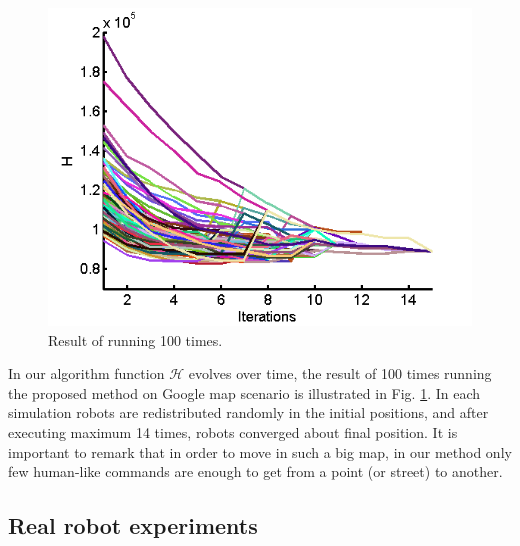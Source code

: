 \documentclass[twocolumn]{svjour3}       %
\begin{document}
\begin{figure}
\centering
\includegraphics[width=0.8 \columnwidth]{Figures/googlemapH100Times.png}
\caption{Result of running 100 times.}
\label{fig:100sim}
\end{figure}

In our algorithm function $\mathcal{H}$ evolves over time, the result of 100 times running the proposed method on Google map scenario is illustrated in Fig. \ref{fig:100sim}. In each simulation robots are redistributed randomly in the initial positions, and after executing maximum 14 times, robots converged about final position. It is important to remark that in order to move in such a big map, in our method only few human-like commands are enough to get from a point (or street) to another.


\subsection{Real robot experiments}

\end{document}
